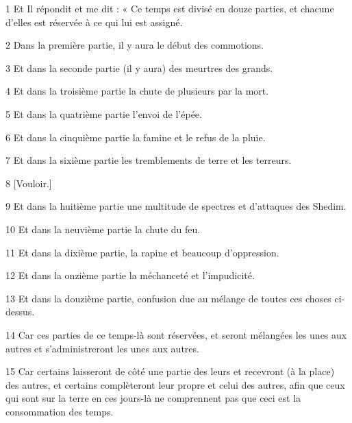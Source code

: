 
\par 1 Et Il répondit et me dit : « Ce temps est divisé en douze parties, et chacune d'elles est réservée à ce qui lui est assigné.

\par 2 Dans la première partie, il y aura le début des commotions.

\par 3 Et dans la seconde partie (il y aura) des meurtres des grands.

\par 4 Et dans la troisième partie la chute de plusieurs par la mort.

\par 5 Et dans la quatrième partie l'envoi de l'épée.

\par 6 Et dans la cinquième partie la famine et le refus de la pluie.

\par 7 Et dans la sixième partie les tremblements de terre et les terreurs.

\par 8 [Vouloir.]

\par 9 Et dans la huitième partie une multitude de spectres et d'attaques des Shedim.

\par 10 Et dans la neuvième partie la chute du feu.

\par 11 Et dans la dixième partie, la rapine et beaucoup d'oppression.

\par 12 Et dans la onzième partie la méchanceté et l'impudicité.

\par 13 Et dans la douzième partie, confusion due au mélange de toutes ces choses ci-dessus.

\par 14 Car ces parties de ce temps-là sont réservées, et seront mélangées les unes aux autres et s'administreront les unes aux autres.

\par 15 Car certains laisseront de côté une partie des leurs et recevront (à la place) des autres, et certains complèteront leur propre et celui des autres, afin que ceux qui sont sur la terre en ces jours-là ne comprennent pas que ceci est la consommation des temps.


